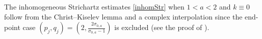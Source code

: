 \documentclass[pdftex]{sigma}
\numberwithin{equation}{section}
\def\s{\sigma}
\begin{document}
The inhomogeneous Strichartz estimates \eqref{inhomStr} when $1<a<2$ and $k\equiv 0$ follow from the Christ--Kiselev lemma \cite{CK} and a complex interpolation since the end-point case $(p_j,q_j)=(2,\frac{2\s_{0,a}}{\s_{0,a}-1})$ is excluded (see the proof of \cite[Theorem 6]{BT}).
\end{document}
